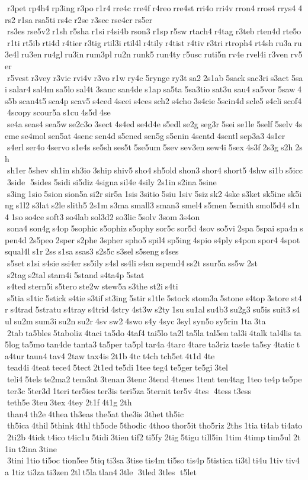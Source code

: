  r3pet rp4h4 rp3ing r3po r1r4 rre4c rre4f r4reo rre4st rri4o rri4v rron4 rros4 rrys4 4rs2 r1sa rsa5ti rs4c r2se r3sec rse4cr rs5er  rs3es rse5v2 r1sh r5sha r1si r4si4b rson3 r1sp r5sw rtach4 r4tag r3teb rten4d rte5o r1ti rt5ib rti4d r4tier r3tig rtil3i rtil4l r4tily r4tist r4tiv r3tri rtroph4 rt4sh ru3a ru3e4l ru3en ru4gl ru3in rum3pl ru2n runk5 run4ty r5usc ruti5n rv4e rvel4i r3ven rv5er  r5vest r3vey r3vic rvi4v r3vo r1w ry4c 5rynge ry3t sa2 2s1ab 5sack sac3ri s3act 5sai salar4 sal4m sa5lo sal4t 3sanc san4de s1ap sa5ta 5sa3tio sat3u sau4 sa5vor 5saw 4s5b scan4t5 sca4p scav5 s4ced 4scei s4ces sch2 s4cho 3s4cie 5scin4d scle5 s4cli scof4 4scopy scour5a s1cu 4s5d 4se  se4a seas4 sea5w se2c3o 3sect 4s4ed se4d4e s5edl se2g seg3r 5sei se1le 5self 5selv 4seme se4mol sen5at 4senc sen4d s5ened sen5g s5enin 4sentd 4sentl sep3a3 4s1er  s4erl ser4o 4servo s1e4s se5sh ses5t 5se5um 5sev sev3en sew4i 5sex 4s3f 2s3g s2h 2sh  sh1er 5shev sh1in sh3io 3ship shiv5 sho4 sh5old shon3 shor4 short5 4shw si1b s5icc 3side  5sides 5sidi si5diz 4signa sil4e 4sily 2s1in s2ina 5sine  s3ing 1sio 5sion sion5a si2r sir5a 1sis 3sitio 5siu 1siv 5siz sk2 4ske s3ket sk5ine sk5ing s1l2 s3lat s2le slith5 2s1m s3ma small3 sman3 smel4 s5men 5smith smol5d4 s1n4 1so so4ce soft3 so4lab sol3d2 so3lic 5solv 3som 3s4on  sona4 son4g s4op 5sophic s5ophiz s5ophy sor5c sor5d 4sov so5vi 2spa 5spai spa4n spen4d 2s5peo 2sper s2phe 3spher spho5 spil4 sp5ing 4spio s4ply s4pon spor4 4spot squal4l s1r 2ss s1sa ssas3 s2s5c s3sel s5seng s4ses  s5set s1si s4sie ssi4er ss5ily s4sl ss4li s4sn sspend4 ss2t ssur5a ss5w 2st  s2tag s2tal stam4i 5stand s4ta4p 5stat  s4ted stern5i s5tero ste2w stew5a s3the st2i s4ti  s5tia s1tic 5stick s4tie s3tif st3ing 5stir s1tle 5stock stom3a 5stone s4top 3store st4r s4trad 5stratu s4tray s4trid 4stry 4st3w s2ty 1su su1al su4b3 su2g3 su5is suit3 s4ul su2m sum3i su2n su2r 4sv sw2 4swo s4y 4syc 3syl syn5o sy5rin 1ta 3ta  2tab ta5bles 5taboliz 4taci ta5do 4taf4 tai5lo ta2l ta5la tal5en tal3i 4talk tal4lis ta5log ta5mo tan4de tanta3 ta5per ta5pl tar4a 4tarc 4tare ta3riz tas4e ta5sy 4tatic ta4tur taun4 tav4 2taw tax4is 2t1b 4tc t4ch tch5et 4t1d 4te  tead4i 4teat tece4 5tect 2t1ed te5di 1tee teg4 te5ger te5gi 3tel  teli4 5tels te2ma2 tem3at 3tenan 3tenc 3tend 4tenes 1tent ten4tag 1teo te4p te5pe ter3c 5ter3d 1teri ter5ies ter3is teri5za 5ternit ter5v 4tes  4tess t3ess  teth5e 3teu 3tex 4tey 2t1f 4t1g 2th  than4 th2e 4thea th3eas the5at the3is 3thet th5ic  th5ica 4thil 5think 4thl th5ode 5thodic 4thoo thor5it tho5riz 2ths 1tia ti4ab ti4ato 2ti2b 4tick t4ico t4ic1u 5tidi 3tien tif2 ti5fy 2tig 5tigu till5in 1tim 4timp tim5ul 2t1in t2ina 3tine  3tini 1tio ti5oc tion5ee 5tiq ti3sa 3tise tis4m ti5so tis4p 5tistica ti3tl ti4u 1tiv tiv4a 1tiz ti3za ti3zen 2tl t5la tlan4 3tle  3tled 3tles  t5let 